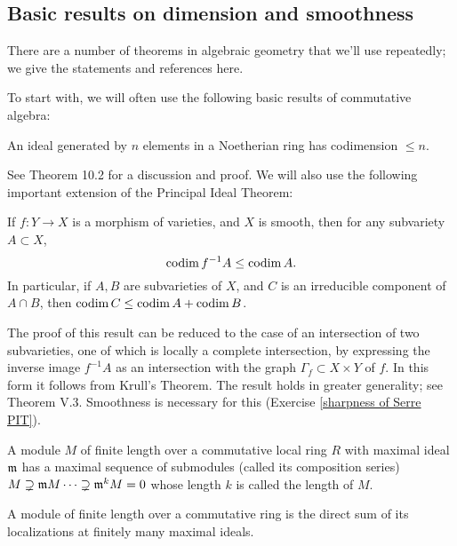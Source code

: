 \subsection{Basic results on dimension and smoothness}

There are a number of theorems in algebraic geometry that we'll use repeatedly; we give the statements and references here.

To start with, we will often use  the following basic results of commutative algebra:

\begin{thm} \label{Krull}
An ideal generated by $n$ elements in a Noetherian ring has codimension
$\leq n$. 
\end{thm}


See \cite{Eisenbud1995} Theorem 10.2 for a discussion and proof.
We will also use the following important extension of the Principal Ideal Theorem:

\begin{thm}\label{Serre}
If  $f:Y\to X$ is a morphism of varieties, and $X$ is smooth, then for any subvariety $A\subset X$, 
$$
\operatorname{codim} f^{-1}A \leq \operatorname{codim} A.
$$
In particular, if $A,B$ are subvarieties of $X$, and $C$ is an irreducible component of $A\cap B$,
 then $\operatorname{codim} C \leq \operatorname{codim} A + \operatorname{codim} B$.
\end{thm}
The proof of this result can be reduced to the case of an intersection of two subvarieties, one of which is locally a complete intersection, by expressing the inverse image $f^{-1}A$ as an intersection with the graph $\Gamma_f \subset X \times Y$ of $f$. In this form it follows from Krull's 
Theorem. The result holds in greater generality; see %
\cite{MR1771925} Theorem V.3. Smoothness is necessary for this (Exercise \ref{sharpness of Serre PIT}).

\begin{thm}\label{J-H}
A module $M$ of finite length over a commutative local ring $R$ with maximal ideal $\mathfrak m$ 
has a maximal sequence of submodules (called its composition series)
$M\supsetneq \mathfrak m M\cdots\supsetneq \mathfrak m^{k}M = 0$
whose length $k$ is called the length of $M$.
\end{thm}

\begin{thm}\label{chinese}
A module of finite length over a commutative ring is the direct sum of its localizations at 
finitely many maximal
ideals.
\end{thm}


